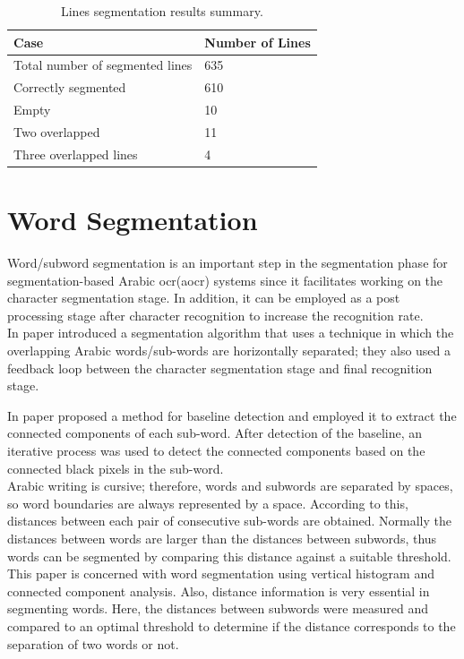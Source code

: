\begin{table}[!htb]
\centering
\begin{tabular}{|l|l|}
\hline
\textbf{Case}                   & \textbf{Number of Lines} \\ \hline
Total number of segmented lines & 635                      \\ \hline
Correctly segmented             & 610                      \\ \hline
Empty                           & 10                       \\ \hline
Two overlapped                  & 11                       \\ \hline
Three overlapped lines          & 4                        \\ \hline
\end{tabular}
\caption{Lines segmentation results summary.}
\label{table:1}
\end{table}


\section{Word Segmentation}
Word/subword segmentation is an important step in the segmentation phase for segmentation-based Arabic \acrshort{ocr}(\acrshort{aocr}) systems since it facilitates working on the character segmentation stage. In addition, it can be employed as a post processing stage after character recognition to increase the recognition rate.\\

In paper \cite{article} 
introduced a segmentation algorithm that uses a technique in which the overlapping Arabic words/sub-words are horizontally separated; they also used a feedback loop between the character segmentation stage and final recognition stage. 

In paper \cite{jawad_h_alkhateeb}
proposed a method for baseline detection and employed it to extract the connected components of each sub-word. After detection of the baseline, an iterative process was used to detect the connected components based on the connected black pixels in the sub-word. \\

\noindent
Arabic writing is cursive; therefore, words and subwords are separated by spaces, so word boundaries are always represented by a space. According  to  this, distances between each pair of consecutive sub-words are obtained. Normally the distances between words are larger than the distances between subwords, thus words can be segmented by comparing this distance against a suitable threshold. This paper is concerned with word segmentation using vertical histogram and connected component analysis. Also, distance  information is very essential in segmenting words. Here, the distances between subwords were measured and compared to an optimal threshold to determine if the distance corresponds to the separation of two words or not. 

